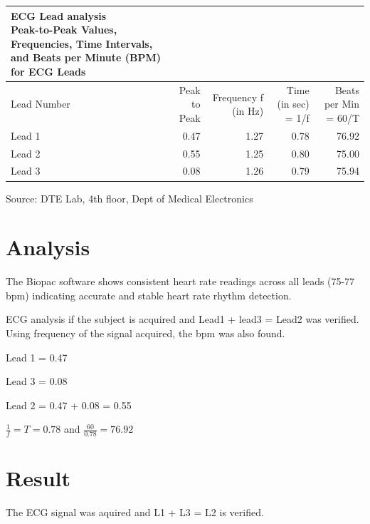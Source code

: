 \documentclass[
  11pt,
  letterpaper,
  DIV=11,
  numbers=noendperiod]{scrreprt}
\begin{document}
\setlength{\LTpost}{0mm}
\begin{longtable*}{lrrrr}
\caption*{
{\large ECG Lead analysis} \\ 
{\small Peak-to-Peak Values, Frequencies, Time Intervals, and Beats per Minute (BPM) for ECG Leads}
} \\ 
\toprule
Lead Number & Peak to Peak & Frequency f (in Hz) & Time (in sec) = 1/f & Beats per Min = 60/T \\ 
\midrule\addlinespace[2.5pt]
Lead 1 & 0.47 & 1.27 & 0.78 & 76.92 \\ 
Lead 2 & 0.55 & 1.25 & 0.80 & 75.00 \\ 
Lead 3 & 0.08 & 1.26 & 0.79 & 75.94 \\ 
\bottomrule
\end{longtable*}
\begin{minipage}{\linewidth}
Source: DTE Lab, 4th floor, Dept of Medical Electronics\\
\end{minipage}

\section{Analysis}\label{analysis-1}

The Biopac software shows consistent heart rate readings across all
leads (75-77 bpm) indicating accurate and stable heart rate rhythm
detection.

ECG analysis if the subject is acquired and Lead1 + lead3 = Lead2 was
verified. Using frequency of the signal acquired, the bpm was also
found.

Lead 1 = 0.47

Lead 3 = 0.08

Lead 2 = 0.47 + 0.08 = 0.55

\(\frac{1}{f} = T = 0.78\) and \(\frac{60}{0.78} = 76.92\)

\section{Result}\label{result-1}

The ECG signal was aquired and L1 + L3 = L2 is verified.
\end{document}
